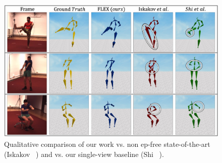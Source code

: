 \begin{figure}[t]
\centering
\includegraphics[width=\linewidth]{./images/competitors_grid.jpg}
\vspace{-20pt }
\caption{
Qualitative comparison of our work vs. non ep-free state-of-the-art (Iskakov \etal~\cite{iskakov2019learnable}) and vs. our single-view baseline (Shi \etal~\cite{shi2020motionet}).}
\label{fig:competitors}
\ifeccv
\else
\vspace{-17pt}
\fi
\end{figure}